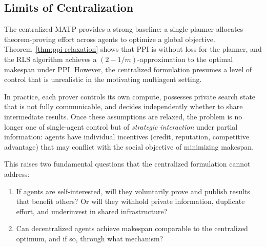 

\subsection{Limits of Centralization}\label{sec:limits-centralization}

The centralized MATP provides a strong baseline: a single planner allocates theorem-proving effort across agents to optimize a global objective. Theorem~\ref{thm:ppi-relaxation} shows that PPI is without loss for the planner, and the RLS algorithm achieves a $(2-1/m)$-approximation to the optimal makespan under PPI. However, the centralized formulation presumes a level of control that is unrealistic in the motivating multiagent setting.

In practice, each prover controls its own compute, possesses private search state that is not fully communicable, and decides independently whether to share intermediate results. Once these assumptions are relaxed, the problem is no longer one of single-agent control but of \emph{strategic interaction} under partial information: agents have individual incentives (credit, reputation, competitive advantage) that may conflict with the social objective of minimizing makespan.

This raises two fundamental questions that the centralized formulation cannot address:
\begin{enumerate}
    \item If agents are self-interested, will they voluntarily prove and publish results that benefit others? Or will they withhold private information, duplicate effort, and underinvest in shared infrastructure?
    
    \item Can decentralized agents achieve makespan comparable to the centralized optimum, and if so, through what mechanism?
\end{enumerate}

